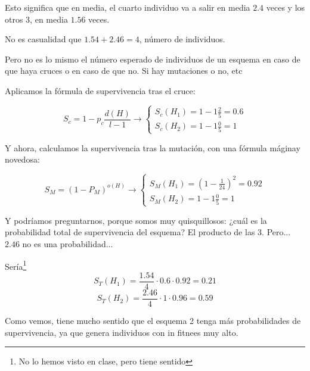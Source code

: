 \documentclass{apuntes}
\begin{document}
\begin{problem}[1]
Esto significa que en media, el cuarto individuo va a salir en media $2.4$ veces y los otros 3, en media $1.56$ veces. 

No es casualidad que $1.54+2.46 = 4$, número de individuos.

Pero no es lo mismo el número esperado de individuos de un esquema en caso de que haya cruces o en caso de que no. Si hay mutaciones o no, etc

Aplicamos la fórmula de supervivencia tras el cruce:

\[
S_c = 1-p_c\frac{d(H)}{l-1} \to \left\{\begin{array}{c}S_c(H_1) = 1-1\frac{2}{5}=0.6\\S_c(H_2) = 1-1\frac{0}{5} = 1 \end{array}\right.
\]


Y ahora, calculamos la supervivencia tras la mutación, con una fórmula máginay novedosa:

\[
S_M = (1-P_M)^{o(H)} \to \left\{\begin{array}{c}S_M(H_1) = (1-\frac{1}{24})^2=0.92\\S_M(H_2) = 1-1\frac{0}{5} = 1 \end{array}\right.
\]


Y podríamos preguntarnos, porque somos muy quisquillosos: ¿cuál es la probabilidad total de supervivencia del esquema? El producto de las 3. Pero... $2.46$ no es una probabilidad...

Sería\footnote{No lo hemos visto en clase, pero tiene sentido}
\[S_T(H_1) = \frac{1.54}{4}·0.6·0.92= 0.21\]
\[S_T(H_2) = \frac{2.46}{4}·1·0.96  = 0.59\]

Como vemos, tiene mucho sentido que el esquema 2 tenga más probabilidades de supervivencia, ya que genera individuos con in fitnees muy alto.

\end{problem}
\end{document}
